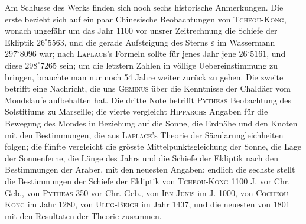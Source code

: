 Am Schlusse des Werks finden sich noch sechs historische Anmerkungen. Die erste bezieht sich auf ein paar Chinesische Beobachtungen von \textsc{Tcheou-Kong}, wonach ungefähr um das Jahr 1100 vor unsrer Zeitrechnung die Schiefe der Ekliptik $26^{\circ}5563$, und die gerade Aufsteigung des Sterns $\varepsilon$ im Wassermann $297^{\circ}8096$ war; nach \textsc{Laplace}'s Formeln sollte für jenes Jahr jene $26^{\circ}5161$, und diese $298^{\circ}7265$ sein; um die letztern Zahlen in völlige Uebereinstimmung zu bringen, brauchte man nur noch 54 Jahre weiter zurück zu gehen. Die zweite betrifft eine Nachricht, die uns \textsc{Geminus} über die Kenntnisse der Chaldäer vom Mondslaufe aufbehalten hat. Die dritte Note betrifft \textsc{Pytheas} Beobachtung des Solstitiums zu Marseille; die vierte vergleicht \textsc{Hipparchs} Angaben für die Bewegung des Mondes in Beziehung auf die Sonne, die Erdnähe und den Knoten mit den Bestimmungen, die aus \textsc{Laplace}'s Theorie der Säcularungleichheiten folgen; die fünfte vergleicht die grösste Mittelpunktsgleichung der Sonne, die Lage der Sonnenferne, die Länge des Jahrs und die Schiefe der Ekliptik nach den Bestimmungen der Araber, mit den neuesten Angaben; endlich die sechste stellt die Bestimmungen der Schiefe der Ekliptik von \textsc{Tcheou-Kong} 1100 J. vor Chr. Geb., von \textsc{Pytheas} 350 vor Chr. Geb., von \textsc{Ibn Junis} im J. 1000, von \textsc{Cocheou-Kong} im Jahr 1280, von \textsc{Ulug-Beigh} im Jahr 1437, und die neuesten von 1801 mit den Resultaten der Theorie zusammen.
